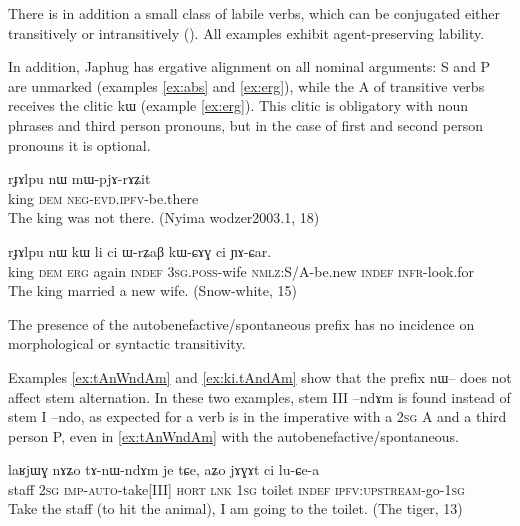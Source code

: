 \documentclass[oldfontcommands,oneside,a4paper,11pt]{article}
\newcommand{\ipa}[1]{{\phon \mbox{#1}}} %
\begin{document}
There is in addition a small class of labile verbs, which can be conjugated either transitively or intransitively (\citealt{jacques12demotion}). All examples exhibit agent-preserving  lability.

In addition, Japhug has ergative alignment on all nominal arguments:  S and P are unmarked (examples \ref{ex:abs} and \ref{ex:erg}), while the A of transitive verbs receives the clitic \ipa{kɯ} (example \ref{ex:erg}). This clitic is obligatory with noun phrases and third person pronouns, but in the case of first and second person pronouns it is optional.  

 \begin{exe}
\ex \label{ex:abs}
\gll
\ipa{rɟɤlpu}  	\ipa{nɯ}  	\ipa{mɯ-pjɤ-rɤʑit}  \\
king \textsc{dem} \textsc{neg-evd.ipfv}-be.there \\
 \glt The king was not there. (Nyima wodzer2003.1, 18)
\end{exe}

 \begin{exe}
\ex \label{ex:erg}
\gll 
\ipa{rɟɤlpu}  	\ipa{nɯ}  	\ipa{kɯ}  	\ipa{li}  	\ipa{ci}  	\ipa{ɯ-rʑaβ}  	\ipa{kɯ-ɕɤɣ}  	\ipa{ci}  	\ipa{ɲɤ-ɕar.}  	 \\
king \textsc{dem} \textsc{erg} again \textsc{indef} \textsc{3sg.poss}-wife \textsc{nmlz}:S/A-be.new \textsc{indef}  \textsc{infr}-look.for \\
\glt The king married a new wife. (Snow-white, 15)
\end{exe}

 The presence of the autobenefactive/spontaneous prefix has no incidence on  morphological or syntactic transitivity. 
 
 Examples \ref{ex:tAnWndAm} and \ref{ex:ki.tAndAm} show that the prefix \ipa{nɯ--} does not affect stem alternation. In these two examples, stem III   \ipa{--ndɤm} is found instead of stem I \ipa{--ndo}, as expected for a verb is in the imperative with a \textsc{2sg} A and a third person P, even in \ref{ex:tAnWndAm} with the autobenefactive/spontaneous.
 

 \begin{exe}
\ex \label{ex:tAnWndAm}
\gll
\ipa{laʁjɯɣ} 	\ipa{nɤʑo} 	\ipa{tɤ-nɯ-ndɤm} 	\ipa{je} 	\ipa{tɕe,} 	\ipa{aʑo} 	\ipa{jɤɣɤt} 	\ipa{ci} 	\ipa{lu-ɕe-a} 	\\
staff \textsc{2sg} \textsc{imp-auto}-take[III] \textsc{hort} \textsc{lnk} \textsc{1sg} toilet \textsc{indef} \textsc{ipfv:upstream}-go-\textsc{1sg} \\
\glt Take the staff (to hit the animal), I am going to the toilet. (The tiger, 13) 
\end{exe}
\end{document}
